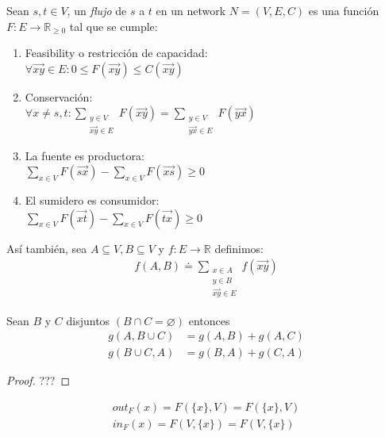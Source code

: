 \begin{definition}[Flujo]
Sean $s,t \in V$, un \emph{flujo} de $s$ a $t$ en un network $N = (V, E, C)$
es una función $F : E \to \mathbb{R}_{\ge 0}$ tal que se cumple:
\begin{enumerate}
    \item Feasibility o restricción de capacidad:\\
        $\forall \overrightarrow{xy} \in E : 0 \le F(\overrightarrow{xy}) \le C(\overrightarrow{xy})$ \label{feasible} 
    \item Conservación:\\
        $\forall x \neq s,t : \sum_{\substack{y\in V \\ \overrightarrow{xy} \in E}} F\left(\overrightarrow{xy}\right) = \sum_{\substack{y\in V \\ \overrightarrow{yx} \in E}} F\left(\overrightarrow{yx}\right)$  \label{conservacion}
    \item La fuente es productora:\\
        $\sum_{x\in V} F(\overrightarrow{sx}) - \sum_{x\in V} F\left(\overrightarrow{xs}\right) \ge 0$ \label{fuente}
    \item El sumidero es consumidor: \\
        $\sum_{x\in V} F(\overrightarrow{xt}) - \sum_{x\in V} F(\overrightarrow{tx}) \ge 0$ \label{sumidero}
    \end{enumerate}
\end{definition}

Así también, sea $A \subseteq V, B \subseteq V$ y $f : E \to \mathbb{R}$ definimos:\begin{align}
    f(A,B) \doteq \sum_{\substack{x \in A \\ y \in B \\ \overrightarrow{xy} \in E}} f(\overrightarrow{xy})
\end{align}

\begin{proposition}
Sean $B$ y $C$ disjuntos $(B \cap C = \varnothing)$ entonces
\begin{align}
g(A, B\cup C) &= g(A,B) + g(A,C)\\
g(B\cup C, A) &= g(B,A) + g(C,A)    
\end{align}
\end{proposition}

\begin{proof}
???
\end{proof}

\begin{definition}\label{in/out}
\begin{align}
out_{F}(x) = F(\{x\}, V) = F(\{x\}, V)\\
in_{F}(x) = F(V, \{x\}) = F(V, \{x\})    
\end{align}
\end{definition}

